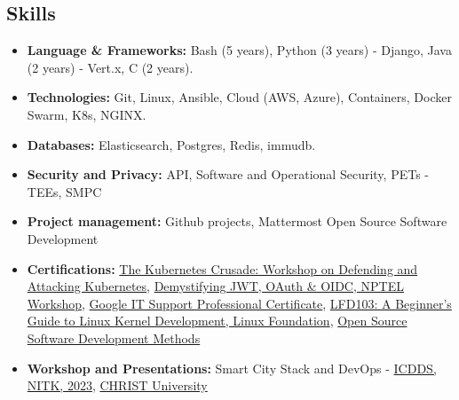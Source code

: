 \documentclass[a4paper,11pt]{article}
\begin{document}
\subsection*{Skills}
\begin{itemize}
\item  \textbf{Language \& Frameworks:} Bash (5 years), Python (3 years) - Django, Java (2 years) - Vert.x, C (2 years).
\item \textbf{Technologies:} Git, Linux, Ansible, Cloud (AWS, Azure), Containers, Docker Swarm, K8s,
NGINX.
\item \textbf{Databases:} Elasticsearch, Postgres, Redis, immudb.
\item \textbf{Security and Privacy:} API, Software and Operational Security, PETs - TEEs, SMPC 
\item  \textbf{Project management:} Github projects, Mattermost Open Source Software Development
\item \textbf{Certifications:} \href{https://www.linkedin.com/in/abhi5782-/details/certifications/}{The Kubernetes Crusade: Workshop on Defending and Attacking Kubernetes}, \href{https://elearn.nptel.ac.in/Ecertificate/?q=NPWS22369227122778}{Demystifying JWT, OAuth \& OIDC, NPTEL Workshop}, \href {https://www.youracclaim.com/badges/848a4c99-ab00-449f-afed-59bc88c6a0cd/linked_in_profile}{Google IT Support Professional Certificate}, \href{https://www.credly.com/badges/c2fbeef3-6d43-4213-af28-0f68dedd3334/linked_in_profile}{LFD103: A Beginner's Guide to Linux Kernel Development, Linux Foundation}, \href{https://www.coursera.org/account/accomplishments/certificate/TE3G9PXUEUTR}{Open Source Software Development Methods} 
\item \textbf{Workshop and Presentations:} Smart City Stack and DevOps - \href{https://icdds.org/smartcity.html}{ICDDS, NITK, 2023}, \href{https://edu.ieee.org/in-cucs/events/smart-city-stack-and-devops/}{CHRIST University}
\end{itemize}
\end{document}

